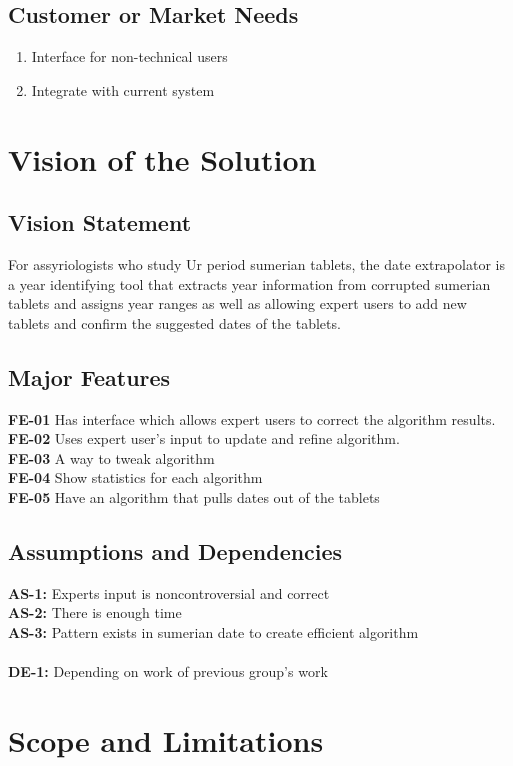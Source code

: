 \documentclass[11pt]{article}
\begin{document}
\subsection{Customer or Market Needs}
\begin{enumerate}
    \item Interface for non-technical users
    \item Integrate with current system 
\end{enumerate}

\section{Vision of the Solution}
\subsection{Vision Statement}
For assyriologists who study Ur period sumerian tablets, the date extrapolator is a year identifying tool that extracts year information from corrupted sumerian tablets and assigns year ranges as well as allowing expert users to add new tablets and confirm the suggested dates of the tablets.
\subsection{Major Features}
\textbf{FE-01} Has interface which allows expert users to correct the algorithm results.\\
\textbf{FE-02} Uses expert user’s input to update and refine algorithm.\\
\textbf{FE-03} A way to tweak algorithm \\
\textbf{FE-04} Show statistics for each algorithm\\
\textbf{FE-05} Have an algorithm that pulls dates out of the tablets
\subsection{Assumptions and Dependencies}
\textbf{AS-1:} Experts input is noncontroversial and correct \\
\textbf{AS-2:} There is enough time \\
\textbf{AS-3:} Pattern exists in sumerian date to create efficient algorithm \\
 \\
 \textbf{DE-1:} Depending on work of previous group’s work \\

\section{Scope and Limitations}
\end{document}
